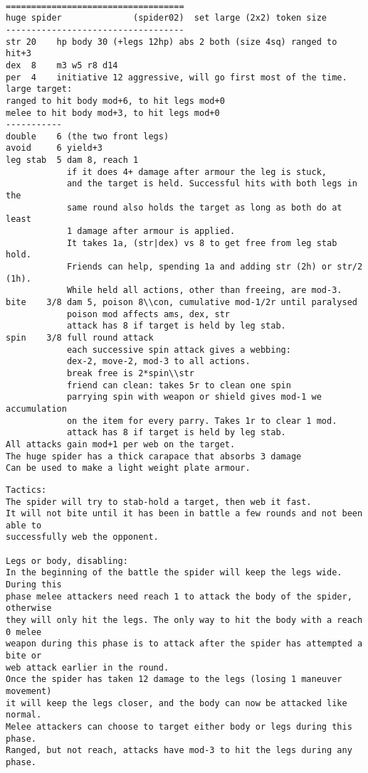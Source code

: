 \

\goodbreak \begin{samepage} \small \begin{verbatim}
===================================
huge spider              (spider02)  set large (2x2) token size
-----------------------------------
str 20    hp body 30 (+legs 12hp) abs 2 both (size 4sq) ranged to hit+3
dex  8    m3 w5 r8 d14
per  4    initiative 12 aggressive, will go first most of the time.
large target:
ranged to hit body mod+6, to hit legs mod+0
melee to hit body mod+3, to hit legs mod+0
-----------
double    6 (the two front legs)
avoid     6 yield+3
leg stab  5 dam 8, reach 1
            if it does 4+ damage after armour the leg is stuck,
            and the target is held. Successful hits with both legs in the
            same round also holds the target as long as both do at least
            1 damage after armour is applied.
            It takes 1a, (str|dex) vs 8 to get free from leg stab hold.
            Friends can help, spending 1a and adding str (2h) or str/2 (1h).
            While held all actions, other than freeing, are mod-3.
bite    3/8 dam 5, poison 8\\con, cumulative mod-1/2r until paralysed
            poison mod affects ams, dex, str
            attack has 8 if target is held by leg stab.
spin    3/8 full round attack
            each successive spin attack gives a webbing:
            dex-2, move-2, mod-3 to all actions.
            break free is 2*spin\\str
            friend can clean: takes 5r to clean one spin
            parrying spin with weapon or shield gives mod-1 we accumulation
            on the item for every parry. Takes 1r to clear 1 mod.
            attack has 8 if target is held by leg stab.
All attacks gain mod+1 per web on the target.
The huge spider has a thick carapace that absorbs 3 damage
Can be used to make a light weight plate armour.
\end{verbatim} \end{samepage} \goodbreak \begin{samepage} \begin{verbatim}
Tactics:
The spider will try to stab-hold a target, then web it fast.
It will not bite until it has been in battle a few rounds and not been able to
successfully web the opponent.

Legs or body, disabling:
In the beginning of the battle the spider will keep the legs wide. During this
phase melee attackers need reach 1 to attack the body of the spider, otherwise
they will only hit the legs. The only way to hit the body with a reach 0 melee
weapon during this phase is to attack after the spider has attempted a bite or
web attack earlier in the round.
Once the spider has taken 12 damage to the legs (losing 1 maneuver movement)
it will keep the legs closer, and the body can now be attacked like normal.
Melee attackers can choose to target either body or legs during this phase.
Ranged, but not reach, attacks have mod-3 to hit the legs during any phase.


\end{verbatim}
\end{samepage}
